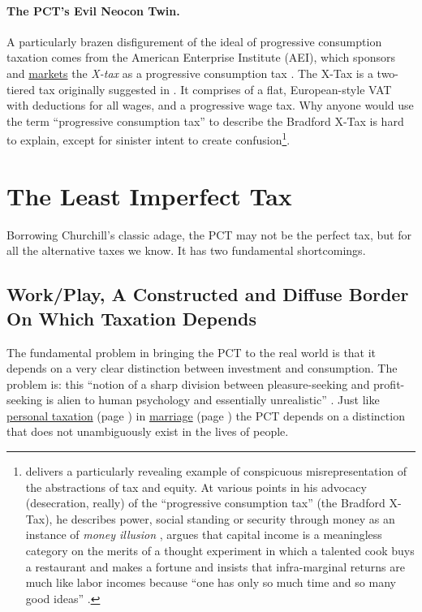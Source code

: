 \paragraph{The PCT's Evil Neocon Twin.} A particularly brazen disfigurement of the ideal of progressive consumption taxation comes from the American Enterprise Institute (AEI), which sponsors and \hyperref[http://www.aei.org/outlook/29082]{markets} the \emph{\citeauthor{Bradford} X-tax} as a progressive consumption tax \citep{Bradford}.
The \citeauthor{Bradford1986} X-Tax is a two-tiered tax originally suggested in \citeyear{Bradford1986}.
It comprises of a flat, European-style VAT with deductions for all wages, and a progressive wage tax.
Why anyone would use the term ``progressive consumption tax'' to describe the Bradford X-Tax is hard to explain, except for sinister intent to create confusion\footnote{
	\cite{Shaviro2004} delivers a particularly revealing example of conspicuous misrepresentation of the abstractions of tax and equity.
At various points in his advocacy (desecration, really) of the ``progressive consumption tax'' (the Bradford X-Tax), he describes power, social standing or security through money as an instance of \emph{money illusion} \citeyearpar[106]{Shaviro2004}, argues that capital income is a meaningless category on the merits of a thought experiment in which a talented cook buys a restaurant and makes a fortune \citeyearpar[100]{Shaviro2004} and insists that infra-marginal returns are much like labor incomes because ``one has only so much time and so many good ideas'' \citeyearpar[103]{Shaviro2004}.}.

\section{The Least Imperfect Tax} \label{sec:LeastImperfect} Borrowing Churchill's classic adage, the PCT may not be the perfect tax, but for all the alternative taxes we know.
It has two fundamental shortcomings.

\subsection[Work/Play]{Work/Play, A Constructed and Diffuse Border On Which Taxation Depends} \label{sec:WorkPlay} The fundamental problem in bringing the PCT to the real world is that it depends on a very clear distinction between investment and consumption.
The problem is:
this ``notion of a sharp division between pleasure-seeking and profit-seeking is alien to human psychology and essentially unrealistic'' \citep[203]{Bittker1973}.
Just like \hyperref[des:PersonalTaxation]{personal taxation} (page \pageref{des:PersonalTaxation}) in \hyperref[sec:LoveMarriage]{marriage} (page \pageref{sec:LoveMarriage}) the PCT depends on a distinction that does not unambiguously exist in the lives of people.


